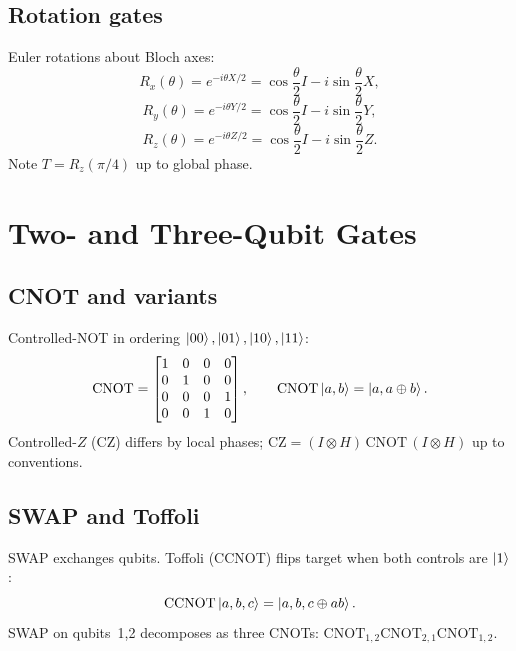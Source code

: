 \subsection{Rotation gates}

Euler rotations about Bloch axes:
\begin{equation}
R_x(\theta)=e^{-i\theta X/2}=\cos\frac{\theta}{2}I-i\sin\frac{\theta}{2}X,
\end{equation}
\begin{equation}
R_y(\theta)=e^{-i\theta Y/2}=\cos\frac{\theta}{2}I-i\sin\frac{\theta}{2}Y,
\end{equation}
\begin{equation}
R_z(\theta)=e^{-i\theta Z/2}=\cos\frac{\theta}{2}I-i\sin\frac{\theta}{2}Z.
\end{equation}
Note $T=R_z(\pi/4)$ up to global phase.

\section{Two- and Three-Qubit Gates}

\subsection{CNOT and variants}

Controlled-NOT in ordering $\ket{00},\ket{01},\ket{10},\ket{11}$:
\begin{equation}
\mathrm{CNOT}=\begin{bmatrix}1&0&0&0\\0&1&0&0\\0&0&0&1\\0&0&1&0\end{bmatrix},\qquad
\mathrm{CNOT}\ket{a,b}=\ket{a,a\oplus b}.
\end{equation}
Controlled-$Z$ (CZ) differs by local phases; $\mathrm{CZ}= (I\otimes H)\,\mathrm{CNOT}\,(I\otimes H)$ up to conventions.

\subsection{SWAP and Toffoli}

SWAP exchanges qubits. Toffoli (CCNOT) flips target when both controls are $\ket{1}$:
\begin{equation}
\mathrm{CCNOT}\ket{a,b,c}=\ket{a,b,c\oplus ab}.
\end{equation}
SWAP on qubits~1,2 decomposes as three CNOTs: $\mathrm{CNOT}_{1,2}\mathrm{CNOT}_{2,1}\mathrm{CNOT}_{1,2}$.


